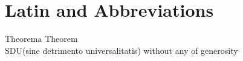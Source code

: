 \documentclass[../rep.tex]{subfiles}
\begin{document}
\renewcommand{\thechapter}{\Roman{chapter}}
\chapter{Latin and Abbreviations}
Theorema \hfill  Theorem\\
SDU(sine detrimento universalitatis) \hfill without any of generosity\\
\end{document}
